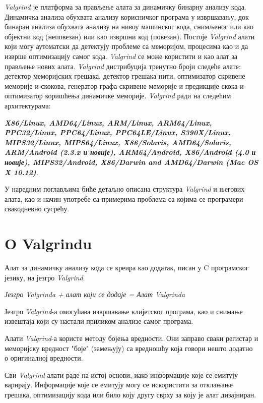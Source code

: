 \documentclass[12pt,oneside]{memoir}
\begin{document}
\indent \textit{Valgrind} је платформа за прављење алата за динамичку бинарну анализу кода. Динамичка анализа обухвата анализу корисничког програма у извршавању, док бинаран анализа обухвата анализу на нивоу машинског кода, снимљеног или као објектни код (неповезан) или као извршни код (повезан). Постоје \textit{Valgrind} алати који могу аутоматски да детектују проблеме са меморијом, процесима као и да изврше оптимизацију самог кода. \textit{Valgrind} се може користити и као алат за прављење нових алата. \textit{Valgrind} дистрибуција тренутно броји следеће алате: детектор меморијских грешака, детектор грешака нити, оптимизатор скривене меморије и скокова, генератор графа скривене меморије и предикције скока и оптимизатор коришћења динамичке меморије. \textit{Valgrind} ради на следећим архитектурама: 
\begin{flushleft}
\textbf{\textit{X86/Linux, AMD64/Linux, ARM/Linux, ARM64/Linux, PPC32/Linux, PPC64/Linux, PPC64LE/Linux, S390X/Linux, MIPS32/Linux, MIPS64/Linux, X86/Solaris, AMD64/Solaris, ARM/Android (2.3.x и новије), ARM64/Android, X86/Android (4.0 и новије), MIPS32/Android, X86/Darwin and AMD64/Darwin (Mac OS X 10.12)}}.
\end{flushleft}

\indent У наредним поглављима биће детаљно описана структура \textit{Valgrind} и његових алата, као и начин употребе са примерима проблема са којима се програмери свакодневно сусрећу.

\section{O Valgrindu}

\indent Алат за динамичку анализу кода се креира као додатак, писан у C програмског језику, на језгро \textit{Valgrind}. 


\begin{center}
\textit{Језгро Valgrinda + алат који се додаје = Алат Valgrinda} 
\end{center}


\indent Језгро \textit{Valgrind}-а омогућава извршавање клијетског програма, као и снимање извештаја који су настали приликом анализе самог програма. 

\indent Алати \textit{Valgrind}-а користе методу бојења вредности. Они заправо сваки регистар и меморијску вредност "боје" (замењују) са вредношћу која говори нешто додатно о оригиналној вредности. 

\indent Сви \textit{Valgrind} алати раде на истој основи, иако информације које се емитују варирају. Информације које се емитују могу се искористити за отклањање грешака, оптимизацију кода или било коју другу сврху за коју је алат дизајниран.
\end{document}
